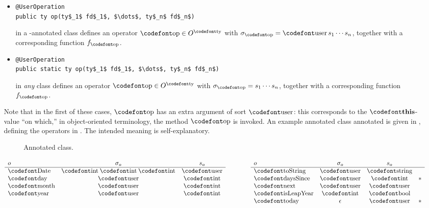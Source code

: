 \begin{itemize}
\item 
\begin{lstlisting}
@UserOperation
public ty op(ty$_1$ fd$_1$, $\dots$, ty$_n$ fd$_n$)
\end{lstlisting}
%
in a \UserType-annotated class defines an operator $\op\in O^\ty$ with $\sigma_\op=\userS\, s_1\cdots s_n$, together with a corresponding function $f_\op$.

\item 
\begin{lstlisting}
@UserOperation
public static ty op(ty$_1$ fd$_1$, $\dots$, ty$_n$ fd$_n$)
\end{lstlisting}
%
in \emph{any} \publicT class defines an operator $\op\in O^\ty$ with $\sigma_\op=s_1\cdots s_n$, together with a corresponding function $f_\op$.
\end{itemize}
%
Note that in the first of these cases, $\op$ has an extra argument of sort $\userS$: this corresponds to the $\thisT$-value ``on which,'' in object-oriented terminology, the method $\op$ is invoked.
%
An example annotated class annotated is given in , defining the operators in . The intended meaning is self-explanatory.
%
\begin{figure}[p]

\caption{Annotated  class.}
\label{fig:Date}
\end{figure}
%
\begin{table}[t]\centering
\caption[position=top]{Operators defined by the  class of , with sorts and signatures. The $*$-marked operators are indeterminate}
\abovedisplayskip=0pt
\belowdisplayskip=0pt
\[\begin{array}[t]{l@{{\quad}}c@{{\quad}}c}
o            & \sigma_o              & s_o    \\
\hline
\DateO       & \intS\: \intS\: \intS & \userS \\
\dayO        & \userS                & \intS  \\
\monthO      & \userS                & \intS  \\
\yearO       & \userS                & \intS  \\
\end{array}\qquad\qquad\begin{array}[t]{l@{{\quad}}c@{{\quad}}c@{{\quad}}c}
o            & \sigma_o & s_o \\
\hline
\toStringO   & \userS   & \stringS \\
\daysSinceO  & \userS   & \intS    & * \\
\nextO       & \userS   & \userS   \\
\isLeapYearO & \intS    & \boolS   \\
\todayO      & \epsilon & \userS   & * \\
\end{array}\]
\label{tab:operators}
\end{table}

